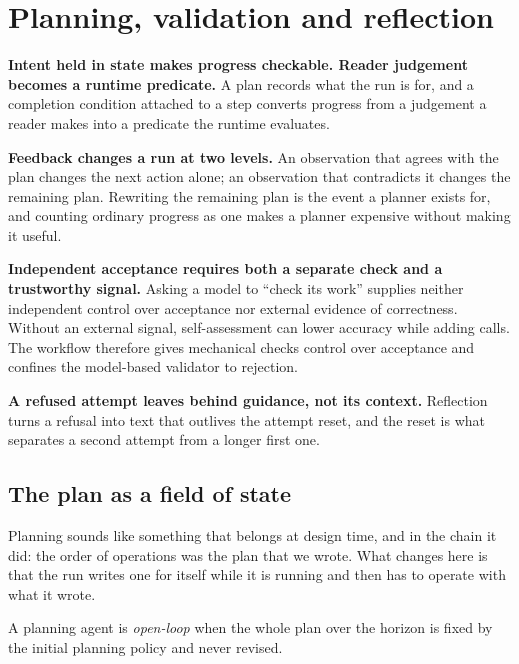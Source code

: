 \section{Planning, validation and reflection}
\label{sec:planning}

\begin{upshot}
\item \textbf{Intent held in state makes progress checkable. Reader judgement becomes a runtime
  predicate.} A plan records what the run is for, and a completion condition attached to a step
  converts progress from a judgement a reader makes into a predicate the runtime evaluates.
\item \textbf{Feedback changes a run at two levels.} An observation that agrees with the plan
  changes the next action alone; an observation that contradicts it changes the remaining plan.
  Rewriting the remaining plan is the event a planner exists for, and counting ordinary progress as
  one makes a planner expensive without making it useful.
\item \textbf{Independent acceptance requires both a separate check and a trustworthy signal.}
  Asking a model to ``check its work'' supplies neither independent control over acceptance nor
  external evidence of correctness. Without an external signal, self-assessment can lower accuracy
  while adding calls. The workflow therefore gives mechanical checks control over acceptance and
  confines the model-based validator to rejection.
\item \textbf{A refused attempt leaves behind guidance, not its context.} Reflection turns a
  refusal into text that outlives the attempt reset, and the reset is what separates a second
  attempt from a longer first one.
\end{upshot}

\subsection{The plan as a field of state}
\label{sec:planning-plan}

Planning sounds like something that belongs at design time, and in the chain it did: the order of
operations was the plan that we wrote. What changes here is that the run writes one for itself
while it is running and then has to operate with what it wrote.

\begin{definition}
\label{def:open-loop}
A planning agent is \emph{open-loop} when the whole plan over the horizon is fixed by the initial 
planning policy and never revised.
\end{definition}

